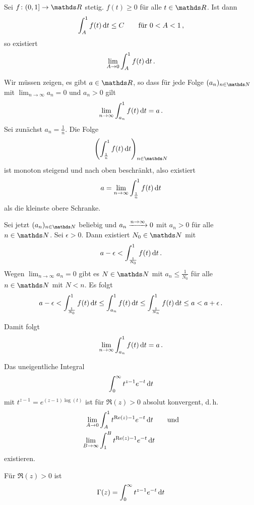 \begin{lemm}\label{lemma:majoranten-int}
Sei $f\colon (0,1] \ra \RR$ stetig. $f(t) \geq 0$ für alle $t \in\RR$.
Ist dann
\[
	\int_A^1 f(t) \,\mathrm{d} t
	\leq C
	\qquad \text{für } 0 < A < 1
	\,,
\]
so existiert
\[
	\lim_{A\to 0} \int_A^1 f(t) \,\mathrm{d} t
	\,.
\]
\end{lemm}
\begin{bewe}
Wir müssen zeigen, es gibt $a \in \RR$, so dass für jede Folge $(a_n)_{n\in\NN}$ mit $\lim_{n\to\infty} a_n = 0$ und $a_n > 0$ gilt
\[
	\lim_{n\to\infty} \int_{a_n}^1 f(t) \,\mathrm{d} t
	= a
	\,.
\]
Sei zunächst $a_n = \frac{1}{n}$. Die Folge
\[
	\left(\int_{\frac{1}{n}}^1 f(t) \opd t\right)_{n\in\NN}
\]
ist monoton steigend und nach oben beschränkt, also existiert
\[
	a = \lim_{n\to\infty} \int_{\frac{1}{n}}^1 f(t) \,\mathrm{d} t
\]
als die kleinste obere Schranke.

Sei jetzt $(a_n)_{n\in\NN}$ beliebig und $a_n \xrightarrow{n\to\infty} 0$ mit $a_n > 0$ für alle $n\in\NN$.
Sei $\epsilon > 0$.
Dann existiert $N_0 \in \NN$ mit
\[
	a - \epsilon
	< \int_{\frac{1}{N_0}}^1 f(t) \,\mathrm{d} t
	\,.
\]
Wegen $\lim_{n\to\infty} a_n = 0$ gibt es $N\in\NN$ mit $a_n \leq \frac{1}{N_0}$ für alle $n\in\NN$ mit $N < n$.
Es folgt
\[
	a - \epsilon
	< \int_{\frac{1}{N_0}}^1 f(t)\,\mathrm{d} t
	\leq \int_{a_n}^1 f(t)\,\mathrm{d} t
	\leq \int^1_{\frac{1}{N_n}} f(t)\,\mathrm{d} t
	\leq a
	< a+\epsilon
	\,.
\]

Damit folgt
\[
	\lim_{n\to\infty} \int_{a_n}^1 f(t) \,\mathrm{d} t
	= a
	\,.
\]
\end{bewe}

\begin{satz-list}
\item Das uneigentliche Integral
\[
	\int_0^\infty t^{z-1}e^{-t} \,\mathrm{d} t
\]
mit $t^{z-1} = e^{(z-1)\log(t)}$ ist für $\Re(z) > 0$ absolut konvergent, d.\,h.
\begin{align*}
	\lim_{A\to 0} &\int_A^1 t^{\mathrm{Re}(z)-1}e^{-t} \,\mathrm{d} t
	\qquad \text{und} \\
	\lim_{B\to\infty} &\int_1^B t^{\mathrm{Re}(z)-1}e^{-t} \,\mathrm{d} t
\end{align*}
existieren.

\item Für $\Re(z) > 0$ ist
\[
	\Gamma(z) = \int_0^\infty t^{z-1}e^{-t} \,\mathrm{d} t
\]
\end{satz-list}

